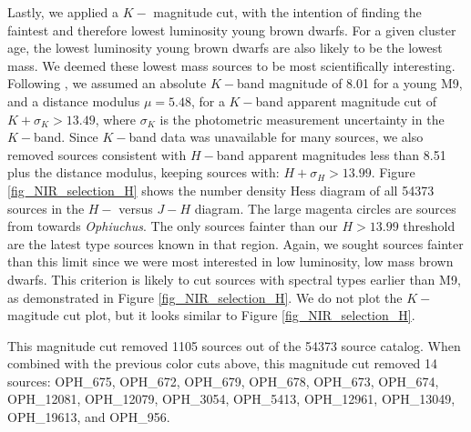 Lastly, we applied a $K-$ magnitude cut, with the intention of finding the faintest and therefore lowest luminosity young brown dwarfs.  For a given cluster age, the lowest luminosity young brown dwarfs are also likely to be the lowest mass.  We deemed these lowest mass sources to be most scientifically interesting.  Following \citet{allers06}, we assumed an absolute $K-$band magnitude of 8.01 for a young M9, and a distance modulus $\mu=5.48$, for a $K-$band apparent magnitude cut of $K + \sigma_{K} > 13.49$, where $\sigma_K$ is the photometric measurement uncertainty in the $K-$band.  Since $K-$band data was unavailable for many sources, we also removed sources consistent with $H-$band apparent magnitudes less than 8.51 plus the distance modulus, keeping sources with: $H+\sigma_{H} > 13.99$.  Figure \ref{fig_NIR_selection_H} shows the number density Hess diagram of all 54373 sources in the $H-$ versus $J-H$ diagram.  The large magenta circles are sources from \citet{allers06} towards \emph{Ophiuchus}.  The only \citet{allers06} sources fainter than our $H>13.99$ threshold are the latest type sources known in that region.  Again, we sought sources fainter than this limit since we were most interested in low luminosity, low mass brown dwarfs.  This criterion is likely to cut sources with spectral types earlier than M9, as demonstrated in Figure \ref{fig_NIR_selection_H}.  We do not plot the $K-$magitude cut plot, but it looks similar to Figure \ref{fig_NIR_selection_H}.

This magnitude cut removed 1105 sources out of the 54373 source catalog.  When combined with the previous color cuts above, this magnitude cut removed 14 sources: OPH\_675, OPH\_672, OPH\_679, OPH\_678, OPH\_673, OPH\_674, OPH\_12081, OPH\_12079, OPH\_3054, OPH\_5413, OPH\_12961, OPH\_13049, OPH\_19613, and OPH\_956.

